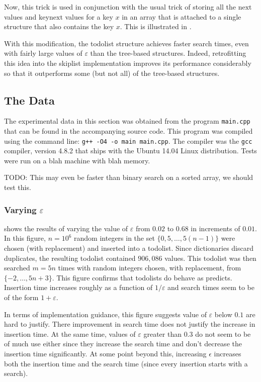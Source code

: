 \documentclass[lotsofwhite]{patmorin}
\newcommand{\eps}{\varepsilon}
\begin{document}
Now, this trick is used in conjunction with the usual trick of storing all
the $\mathrm{next}$ values and $\mathrm{keynext}$ values for a key $x$
in an array that is attached to a single structure that also contains
the key $x$.  This is illustrated in .

With this modification, the todolist structure achieves faster search
times, even with fairly large values of $\eps$ than the tree-based
structures. Indeed, retrofitting this idea into the skiplist
implementation improves its performance considerably so that it
outperforms some (but not all) of the tree-based structures.

\subsection{The Data}

The experimental data in this section was obtained from the program
\texttt{main.cpp} that can be found in the accompanying source code.
This program was compiled using the command line: \texttt{g++ -O4 -o
main main.cpp}. The compiler was the \texttt{gcc} compiler, version 4.8.2
that ships with the Ubuntu 14.04 Linux distribution.  Tests were run on
a blah machine with blah memory.

TODO: This may even be faster than binary search on a sorted array, we should test this.

\subsubsection{Varying $\eps$}

 shows the results of varying the value of $\eps$ from
$0.02$ to $0.68$ in increments of $0.01$. In this figure, $n=10^6$
random integers in the set $\{0, 5,\ldots,5(n-1)\}$ were chosen
(with replacement) and inserted into a todolist. Since dictionaries
discard duplicates, the resulting todolist contained $906,086$ values.
This todolist was then searched $m=5n$ times with random integers chosen,
with replacement, from $\{-2,\ldots,5n+3\}$.  This figure confirms
that todolists do behave as  predicts.  Insertion time
increases roughly as a function of $1/\eps$ and search times seem to be
of the form $1+\eps$.

In terms of implementation guidance, this figure suggests value of
$\eps$ below $0.1$ are hard to justify.  There improvement in search
time does not justify the increase in insertion time.  At the same time,
values of $\eps$ greater than $0.3$ do not seem to be of much use either
since they increase the search time and don't decrease the insertion
time significantly. At some point beyond this, increasing $\epsilon$
increases both the insertion time and the search time (since every
insertion starts with a search).
\end{document}
